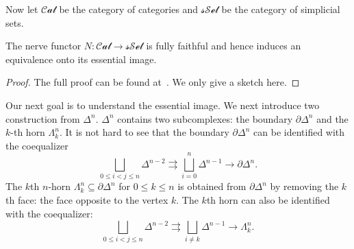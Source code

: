 Now let \(\mathcal{Cat}\) be the category of categories and \(\mathcal{sSet}\) be the category of simplicial sets.

\begin{lemma}
    The nerve functor \(N:\mathcal{Cat}\rightarrow \mathcal{sSet}\) is fully faithful and hence induces an equivalence onto its essential image. 
\end{lemma}
\begin{proof}
    The full proof can be found at~\cite[\href{https://kerodon.net/tag/002Z}{Tag 002Z}]{lurieKerodon2025}. We only give a sketch here.
\end{proof}

Our next goal is to understand the essential image. We next introduce two construction from \(\Delta^n\). \(\Delta^n\) contains two subcomplexes: the boundary \(\partial \Delta^n\) and the \(k\)-th horn \(\Lambda^n_k\). It is not hard to see that the boundary \(\partial \Delta^n\) can be identified with the coequalizer 
\[\bigsqcup_{0\leq i<j\leq n} \Delta^{n-2}\rightrightarrows \bigsqcup_{i=0}^n \Delta^{n-1}\rightarrow \partial \Delta^n.\]
The \(k\)th \(n\)-horn \(\Lambda_k^n\subseteq \partial \Delta^n\) for \(0\leq k\leq n\) is obtained from \(\partial \Delta^n\) by removing the \(k\)th face: the face opposite to the vertex \(k\). The \(k\)th horn can also be identified with the coequalizer:
\[\bigsqcup_{0\leq i<j\leq n} \Delta^{n-2}\rightrightarrows \bigsqcup_{i\neq k} \Delta^{n-1}\rightarrow \Lambda^n_k.\]

